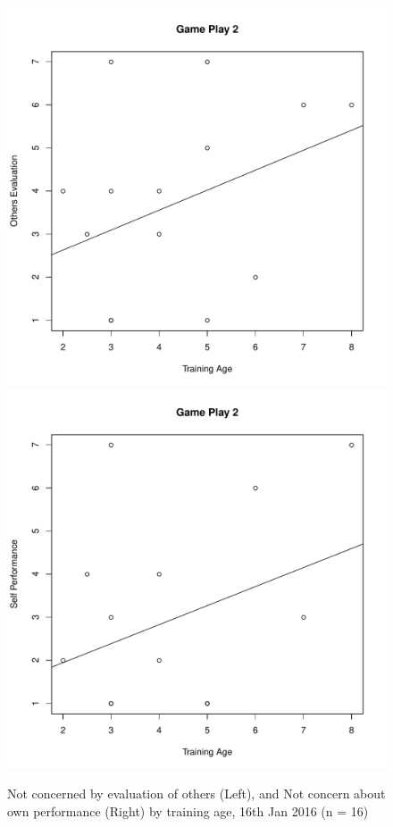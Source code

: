 \begin{CJK}{UTF8}{gbsn}
\begin{figure}[htbp]
  \centering
\includegraphics[scale=.2]{images/othersEval0116TrainingAge.pdf}
\includegraphics[scale=.2]{images/indPerf0116TrainingAge.pdf}
  \caption{Not concerned by evaluation of others (Left), and Not concern about own performance (Right) by training age,  16th Jan 2016 (n = 16)}
  \label{fig:othersEvalIndPerf0116TrainingAge}
\end{figure}



\end{CJK}
